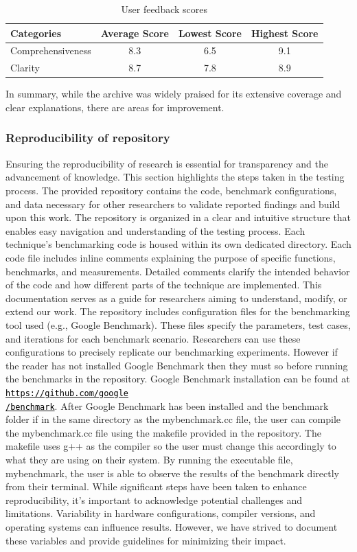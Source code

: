 \documentclass{article}
\theoremstyle{break}
\begin{document}
\begin{table}[htbp]
\centering
\begin{tabular}{lccc}
\toprule
\textbf{Categories} & \textbf{Average Score} & \textbf{Lowest Score} & \textbf{Highest Score} \\
\midrule
Comprehensiveness & 8.3 & 6.5 & 9.1  \\
Clarity & 8.7 & 7.8 & 8.9  \\
\bottomrule
\end{tabular}
\caption{User feedback scores}
\label{tab:optimisations}
\end{table}


\noindent In summary, while the archive was widely praised for its extensive coverage and clear explanations, there are areas for improvement.


\subsubsection*{Reproducibility of repository}
Ensuring the reproducibility of research is essential for transparency and the advancement of knowledge. This section highlights the steps taken in the testing process. The provided repository contains the code, benchmark configurations, and data necessary for other researchers to validate reported findings and build upon this work. The repository is organized in a clear and intuitive structure that enables easy navigation and understanding of the testing process. Each technique's benchmarking code is housed within its own dedicated directory. Each code file includes inline comments explaining the purpose of specific functions, benchmarks, and measurements. Detailed comments clarify the intended behavior of the code and how different parts of the technique are implemented. This documentation serves as a guide for researchers aiming to understand, modify, or extend our work. The repository includes configuration files for the benchmarking tool used (e.g., Google Benchmark). These files specify the parameters, test cases, and iterations for each benchmark scenario. Researchers can use these configurations to precisely replicate our benchmarking experiments. However if the reader has not installed Google Benchmark then they must so before running the benchmarks in the repository. Google Benchmark installation can be found at \href{https://github.com/google/benchmark}{\textcolor{black}{\texttt{https://github.com/google\\/benchmark}}}. After Google Benchmark has been installed and the benchmark folder if in the same directory as the mybenchmark.cc file, the user can compile the mybenchmark.cc file using the makefile provided in the repository. The makefile uses g++ as the compiler so the user must change this accordingly to what they are using on their system. By running the executable file, mybenchmark, the user is able to observe the results of the benchmark directly from their terminal. While significant steps have been taken to enhance reproducibility, it's important to acknowledge potential challenges and limitations. Variability in hardware configurations, compiler versions, and operating systems can influence results. However, we have strived to document these variables and provide guidelines for minimizing their impact.
\end{document}
